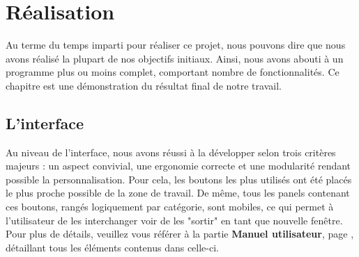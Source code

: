 \documentclass[a4paper]{memoir}
\begin{document}
	\chapter{Réalisation}
		Au terme du temps imparti pour réaliser ce projet, nous pouvons dire que nous avons réalisé la plupart de nos objectifs initiaux. Ainsi, nous avons 
		abouti à un programme plus ou moins complet, comportant nombre de fonctionnalités. Ce chapitre est une démonstration du résultat final de notre 
		travail.
		
		\section{L'interface}
			Au niveau de l'interface, nous avons réussi à la développer selon trois critères majeurs : un aspect convivial, une ergonomie correcte et une 
			modularité rendant possible la personnalisation. Pour cela, les boutons les plus utilisés ont été placés le plus proche possible de la zone de 
			travail. De même, tous les panels contenant ces boutons, rangés logiquement par catégorie, sont mobiles, ce qui permet à l'utilisateur de les 
			interchanger voir de les "sortir" en tant que nouvelle fenêtre. Pour plus de détails, veuillez vous référer à la partie 
			\textbf{Manuel utilisateur}, page \pageref{man-user}, détaillant tous les éléments contenus dans celle-ci.
			
\end{document}

